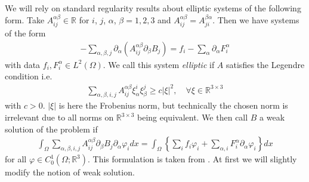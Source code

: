 \documentclass[12pt,a4paper]{article}
\numberwithin{equation}{subsection}
\numberwithin{lemma}{subsection}
\theoremstyle{definition}
\newcommand{\real}{\mathbb{R}}
\begin{document}
We will rely on standard regularity results about elliptic systems 
of the following form. Take $A_{ij}^{\alpha \beta} \in \real$
for $i$, $j$, $\alpha$, $\beta = 1,2,3$ and 
$A_{ij}^{\alpha \beta} = A_{ji}^{\beta \alpha}$. Then we have systems of the 
form 
\begin{align}
    -\sum\limits_{\alpha, \beta, j} \partial_\alpha 
        (A_{ij}^{\alpha \beta} \partial_\beta B_j)
    = f_i - \sum\limits_\alpha \partial_\alpha F_i^\alpha
    \label{eq:elliptic_system}
\end{align}
with data $f_i, F_i^\alpha \in L^2(\Omega)$. We call this system 
\textit{elliptic} if $A$ satisfies the Legendre condition i.e.
\begin{align}
    \sum_{\alpha,\beta,i,j}A_{ij}^{\alpha \beta} \xi_\alpha^i \xi_\beta^j
    \geq c |\xi|^2, \quad \forall \xi \in \real^{3 \times 3} 
    \label{eq:legendre_condition}
\end{align}
with $c > 0$. $|\xi|$ is here the Frobenius norm, but technically the chosen 
norm is irrelevant due to all norms on $\real^{3 \times 3}$ being equivalent.
We then call $B$ a weak solution
of the problem if 
\begin{align}
    \int_\Omega \sum\limits_{\alpha,\beta,i,j} 
        A_{ij}^{\alpha \beta} \partial_\beta B_j \partial_\alpha \varphi_i dx
    = \int_\Omega \left\{ \sum\limits_i f_i \varphi_i + 
        \sum\limits_{\alpha,i} F_i^\alpha \partial_\alpha \varphi_i \right\} dx
    \label{eq:weak_elliptic_system}
\end{align}
for all $\varphi \in C^1_0(\Omega;\real^3)$. This formulation is taken from 
\cite[Sec. 1.3]{lectures_on_elliptic_pdes}. At first we will slightly modify
the notion of weak solution. 
\end{document}
